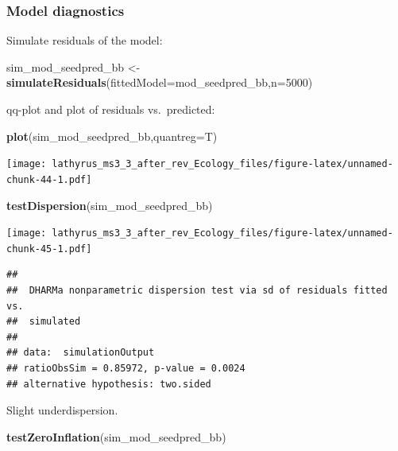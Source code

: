 \documentclass[
]{article}
\newenvironment{Shaded}{\begin{snugshade}}{\end{snugshade}}
\newcommand{\DataTypeTok}[1]{\textcolor[rgb]{0.13,0.29,0.53}{#1}}
\newcommand{\DecValTok}[1]{\textcolor[rgb]{0.00,0.00,0.81}{#1}}
\newcommand{\KeywordTok}[1]{\textcolor[rgb]{0.13,0.29,0.53}{\textbf{#1}}}
\newcommand{\NormalTok}[1]{#1}
\newcommand{\StringTok}[1]{\textcolor[rgb]{0.31,0.60,0.02}{#1}}
\begin{document}
\hypertarget{model-diagnostics-5}{%
\subsubsection{Model diagnostics}\label{model-diagnostics-5}}

Simulate residuals of the model:

\begin{Shaded}
\begin{Highlighting}[]
\NormalTok{sim\_mod\_seedpred\_bb \textless{}{-}}\StringTok{ }\KeywordTok{simulateResiduals}\NormalTok{(}\DataTypeTok{fittedModel=}\NormalTok{mod\_seedpred\_bb,}\DataTypeTok{n=}\DecValTok{5000}\NormalTok{)}
\end{Highlighting}
\end{Shaded}

qq-plot and plot of residuals vs.~predicted:

\begin{Shaded}
\begin{Highlighting}[]
\KeywordTok{plot}\NormalTok{(sim\_mod\_seedpred\_bb,}\DataTypeTok{quantreg=}\NormalTok{T)}
\end{Highlighting}
\end{Shaded}

\texttt{[image: lathyrus\_ms3\_3\_after\_rev\_Ecology\_files/figure-latex/unnamed-chunk-44-1.pdf]}

\begin{Shaded}
\begin{Highlighting}[]
\KeywordTok{testDispersion}\NormalTok{(sim\_mod\_seedpred\_bb)}
\end{Highlighting}
\end{Shaded}

\texttt{[image: lathyrus\_ms3\_3\_after\_rev\_Ecology\_files/figure-latex/unnamed-chunk-45-1.pdf]}

\begin{verbatim}
## 
##  DHARMa nonparametric dispersion test via sd of residuals fitted vs.
##  simulated
## 
## data:  simulationOutput
## ratioObsSim = 0.85972, p-value = 0.0024
## alternative hypothesis: two.sided
\end{verbatim}

Slight underdispersion.

\begin{Shaded}
\begin{Highlighting}[]
\KeywordTok{testZeroInflation}\NormalTok{(sim\_mod\_seedpred\_bb)}
\end{Highlighting}
\end{Shaded}
\end{document}
